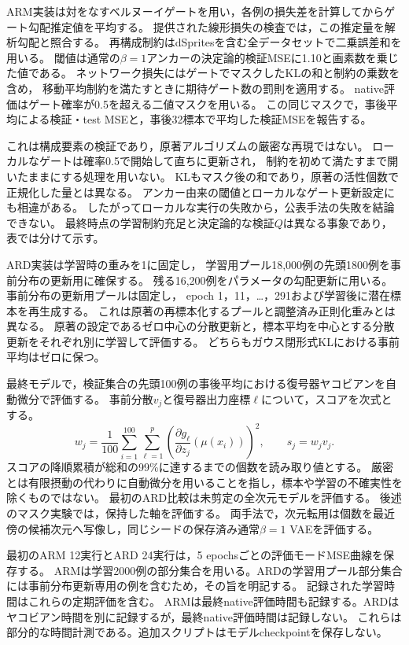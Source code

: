 \documentclass[11pt,a4paper]{ltjsarticle}
\begin{document}
ARM実装は対をなすベルヌーイゲートを用い，各例の損失差を計算してからゲート勾配推定値を平均する。
提供された線形損失の検査では，この推定量を解析勾配と照合する。
再構成制約はdSpritesを含む全データセットで二乗誤差和を用いる。
閾値は通常の$\beta=1$アンカーの決定論的検証MSEに1.10と画素数を乗じた値である。
ネットワーク損失にはゲートでマスクしたKLの和と制約の乗数を含め，
移動平均制約を満たすときに期待ゲート数の罰則を適用する。
native評価はゲート確率が0.5を超える二値マスクを用いる。
この同じマスクで，事後平均による検証・test MSEと，事後32標本で平均した検証MSEを報告する。

これは構成要素の検証であり，原著アルゴリズムの厳密な再現ではない\cite{deboom2020geco}。
ローカルなゲートは確率0.5で開始して直ちに更新され，
制約を初めて満たすまで開いたままにする処理を用いない。
KLもマスク後の和であり，原著の活性個数で正規化した量とは異なる。
アンカー由来の閾値とローカルなゲート更新設定にも相違がある。
したがってローカルな実行の失敗から，公表手法の失敗を結論できない。
最終時点の学習制約充足と決定論的な検証$Q$は異なる事象であり，表では分けて示す。

ARD実装は学習時の重みを1に固定し，
学習用プール18,000例の先頭1800例を事前分布の更新用に確保する。
残る16,200例をパラメータの勾配更新に用いる。
事前分布の更新用プールは固定し，
epoch 1，11，\ldots，291および学習後に潜在標本を再生成する。
これは原著の再標本化するプールと調整済み正則化重みとは異なる\cite{saha2025ardvae}。
原著の設定であるゼロ中心の分散更新と，標本平均を中心とする分散更新をそれぞれ別に学習して評価する。
どちらもガウス閉形式KLにおける事前平均はゼロに保つ。

最終モデルで，検証集合の先頭100例の事後平均における復号器ヤコビアンを自動微分で評価する。
事前分散$v_j$と復号器出力座標$\ell$について，スコアを次式とする。
\begin{equation}
 w_j=\frac{1}{100}\sum_{i=1}^{100}\sum_{\ell=1}^{p}
 \left(\frac{\partial g_\ell}{\partial z_j}(\mu(x_i))\right)^2,
 \qquad s_j=w_jv_j.
 \label{eq:exactard}
\end{equation}
スコアの降順累積が総和の99\%に達するまでの個数を読み取り値とする。
厳密とは有限摂動の代わりに自動微分を用いることを指し，標本や学習の不確実性を除くものではない。
最初のARD比較は未剪定の全次元モデルを評価する。
後述のマスク実験では，保持した軸を評価する。
両手法で，次元転用は個数を最近傍の候補次元へ写像し，同じシードの保存済み通常$\beta=1$ VAEを評価する。

最初のARM 12実行とARD 24実行は，5 epochsごとの評価モードMSE曲線を保存する。
ARMは学習2000例の部分集合を用いる。ARDの学習用プール部分集合には事前分布更新専用の例を含むため，その旨を明記する。
記録された学習時間はこれらの定期評価を含む。
ARMは最終native評価時間も記録する。ARDはヤコビアン時間を別に記録するが，最終native評価時間は記録しない。
これらは部分的な時間計測である。追加スクリプトはモデルcheckpointを保存しない。
\end{document}
